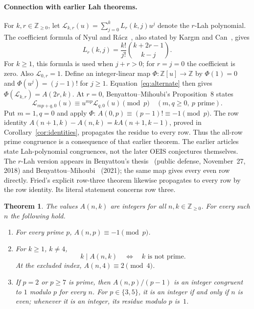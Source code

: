 \documentclass[11pt]{article}
\newtheorem{theorem}{Theorem}
\newcommand{\Nzero}{\mathbb{Z}_{\geq0}}
\begin{document}
\paragraph{Connection with earlier Lah theorems.}
For $k,r\in\Nzero$, let $\mathcal L_{k,r}(u)=\sum_{j=0}^k L_r(k,j)u^j$ denote the
$r$-Lah polynomial. The coefficient formula of
Nyul and R\'acz~\cite[Theorems~3.7 and~3.10]{nyul}, also stated
by Karg{\i}n and Can~\cite[Section~2, (5)--(6)]{kargin}, gives
\[
 L_r(k,j)=\frac{k!}{j!}\binom{k+2r-1}{k-j}.
\]
For $k\geq1$, this formula is used when $j+r>0$; for $r=j=0$
the coefficient is zero. Also $\mathcal L_{0,r}=1$.
Define an integer-linear map $\Phi:\mathbb Z[u]\to\mathbb Z$ by
$\Phi(1)=0$ and $\Phi(u^j)=(j-1)!$ for $j\geq1$.
Equation~\eqref{eq:alternate} then gives
$\Phi(\mathcal L_{k,r})=A(2r,k)$.
At $r=0$, Benyattou--Mihoubi's Proposition~8 states
\[
 \mathcal L_{mp+q,0}(u)\equiv u^{mp}\mathcal L_{q,0}(u)\pmod p
 \quad(m,q\geq0,\ p\text{ prime}).
\]
Put $m=1,q=0$ and apply $\Phi$: $A(0,p)\equiv(p-1)!\equiv-1\pmod p$.
The row identity
$A(n+1,k)-A(n,k)=kA(n+1,k-1)$, proved in
Corollary~\ref{cor:identities}, propagates the residue to every row.
Thus the all-row prime congruence is a consequence of that earlier theorem.
The earlier articles state Lah-polynomial congruences, not the later OEIS
conjectures themselves.
The $r$-Lah version appears in Benyattou's thesis~\cite[Section~2.4,
Proposition~27, pp.~48--49]{thesis} (public defense, November~27, 2018)
and Benyattou--Mihoubi~\cite[Proposition~2, p.~576]{bm2021} (2021);
the same map gives every even row directly.
Fried's explicit row-three theorem likewise propagates to every row by
the row identity. Its literal statement concerns row three.

\begin{theorem}\label{thm:main}
The values $A(n,k)$ are integers for all $n,k\in\Nzero$.
For every such $n$ the following hold.
\begin{enumerate}
\item For every prime $p$, $A(n,p)\equiv-1\pmod p$.
\item For $k\geq1$, $k\ne4$,
\[
 k\mid A(n,k)\quad\Longleftrightarrow\quad k\text{ is not prime}.
\]
At the excluded index, $A(n,4)\equiv2\pmod4$.
\item If $p=2$ or $p\geq7$ is prime, then $A(n,p)/(p-1)$ is an
integer congruent to $1$ modulo $p$ for every $n$.
For $p\in\{3,5\}$, it is an integer if and only if $n$ is even;
whenever it is an integer, its residue modulo $p$ is~$1$.
\end{enumerate}
\end{theorem}
\end{document}
